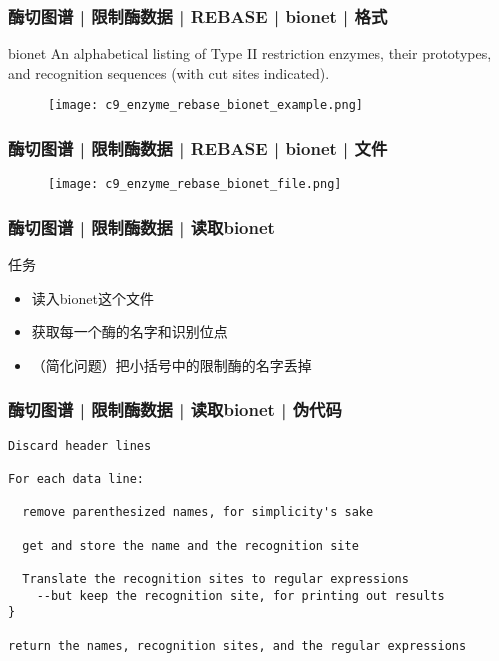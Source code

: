 \begin{frame}
  \frametitle{酶切图谱 | 限制酶数据 | REBASE | bionet | 格式}
  \begin{block}{bionet}
    An alphabetical listing of Type II restriction enzymes, their prototypes, and recognition sequences (with cut sites indicated). 
  \end{block}
  \begin{figure}
    \centering
    \texttt{[image: c9\_enzyme\_rebase\_bionet\_example.png]}
  \end{figure}
\end{frame}

\begin{frame}
  \frametitle{酶切图谱 | 限制酶数据 | REBASE | bionet | 文件}
  \begin{figure}
    \centering
    \texttt{[image: c9\_enzyme\_rebase\_bionet\_file.png]}
  \end{figure}
\end{frame}

\begin{frame}
  \frametitle{酶切图谱 | 限制酶数据 | 读取bionet}
  \begin{block}{任务}
    \begin{itemize}
      \item 读入bionet这个文件
      \item 获取每一个酶的名字和识别位点
      \item （简化问题）把小括号中的限制酶的名字丢掉
    \end{itemize}
  \end{block}
\end{frame}

\begin{frame}[fragile]
  \frametitle{酶切图谱 | 限制酶数据 | 读取bionet | 伪代码}
\begin{lstlisting}[basicstyle=\small\tt]
Discard header lines 

For each data line:

  remove parenthesized names, for simplicity's sake

  get and store the name and the recognition site

  Translate the recognition sites to regular expressions
    --but keep the recognition site, for printing out results
}

return the names, recognition sites, and the regular expressions
\end{lstlisting}
\end{frame}

